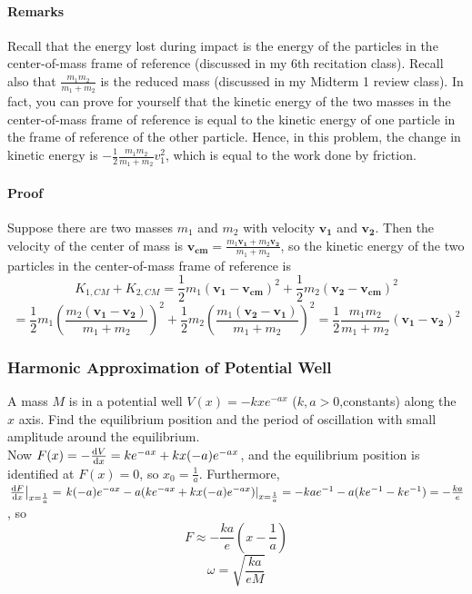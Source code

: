 \documentclass[a4paper,12pt,titlepage]{article}
\begin{document}
\paragraph{Remarks}
Recall that the energy lost during impact is the energy of the particles in the center-of-mass frame of reference (discussed in my 6th recitation class). Recall also that $\frac{m_1m_2}{m_1+m_2}$ is the reduced mass (discussed in my Midterm 1 review class). In fact, you can prove for yourself that the kinetic energy of the two masses in the center-of-mass frame of reference is equal to the kinetic energy of one particle in the frame of reference of the other particle. Hence, in this problem, the change in kinetic energy is $-\frac{1}{2}\frac{m_1m_2}{m_1+m_2}v_1^2$, which is equal to the work done by friction.
\paragraph{Proof}
Suppose there are two masses $m_1$ and $m_2$ with velocity $\mathbf{v_1}$ and $\mathbf{v_2}$. Then the velocity of the center of mass is $\mathbf{v_{cm}}=\frac{m_1\mathbf{v_1}+m_2\mathbf{v_2}}{m_1+m_2}$, so the kinetic energy of the two particles in the center-of-mass frame of reference is 
\[K_{1,CM}+K_{2,CM}=\frac{1}{2}m_1(\mathbf{v_1}-\mathbf{v_{cm}})^2+\frac{1}{2}m_2(\mathbf{v_2}-\mathbf{v_{cm}})^2\]\[=\frac{1}{2}m_1\left(\frac{m_2(\mathbf{v_1}-\mathbf{v_2})}{m_1+m_2}\right)^2+\frac{1}{2}m_2\left(\frac{m_1(\mathbf{v_2}-\mathbf{v_1})}{m_1+m_2}\right)^2=\frac{1}{2}\frac{m_1m_2}{m_1+m_2}(\mathbf{v_1}-\mathbf{v_2})^2\]
\subsubsection{Harmonic Approximation of Potential Well}
A mass $M$ is in a potential well $V(x)=-kxe^{-ax}$ ($k,a>0$,constants) along the $x$ axis. Find the equilibrium position and the period of oscillation with small amplitude around the equilibrium.\\
Now $F(x)=-\frac{\mathrm{d} V}{\mathrm{d} x}=ke^{-ax}+kx(-a)e^{-ax}$, and the equilibrium position is identified at $F(x)=0$, so $x_0=\frac{1}{a}$. Furthermore, $\left.\frac{\mathrm{d} F}{\mathrm{d} x}\right|_{x=\frac{1}{a}}=\left.k(-a)e^{-ax}-a(ke^{-ax}+kx(-a)e^{-ax})\right|_{x=\frac{1}{a}}=-kae^{-1}-a(ke^{-1}-ke^{-1})=-\frac{ka}{e}$, so
\[F\approx-\frac{ka}{e}(x-\frac{1}{a})\]
\[\omega=\sqrt{\frac{ka}{eM}}\]
\end{document}
